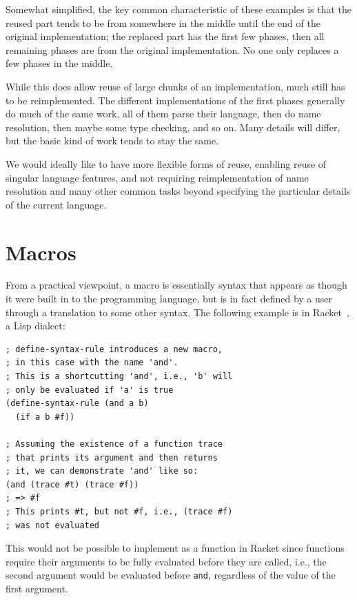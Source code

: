 \documentclass{kththesis}
\begin{document}
Somewhat simplified, the key common characteristic of these examples is that the reused part tends to be from somewhere in the middle until the end of the original implementation; the replaced part has the first few phases, then all remaining phases are from the original implementation. No one only replaces a few phases in the middle.

While this does allow reuse of large chunks of an implementation, much still has to be reimplemented. The different implementations of the first phases generally do much of the same work, all of them parse their language, then do name resolution, then maybe some type checking, and so on. Many details will differ, but the basic kind of work tends to stay the same.

We would ideally like to have more flexible forms of reuse, enabling reuse of singular language features, and not requiring reimplementation of name resolution and many other common tasks beyond specifying the particular details of the current language.

\section{Macros} \label{sec:introduction-macros}

From a practical viewpoint, a macro is essentially syntax that appears as though it were built in to the programming language, but is in fact defined by a user through a translation to some other syntax. The following example is in Racket~\cite{Flatt2010Reference:-Rack}, a Lisp dialect:

\begin{verbatim}
; define-syntax-rule introduces a new macro,
; in this case with the name 'and'.
; This is a shortcutting 'and', i.e., 'b' will
; only be evaluated if 'a' is true
(define-syntax-rule (and a b)
  (if a b #f))

; Assuming the existence of a function trace
; that prints its argument and then returns
; it, we can demonstrate 'and' like so:
(and (trace #t) (trace #f))
; => #f
; This prints #t, but not #f, i.e., (trace #f)
; was not evaluated
\end{verbatim}

This would not be possible to implement as a function in Racket since functions require their arguments to be fully evaluated before they are called, i.e., the second argument would be evaluated before \texttt{and}, regardless of the value of the first argument.
\end{document}
